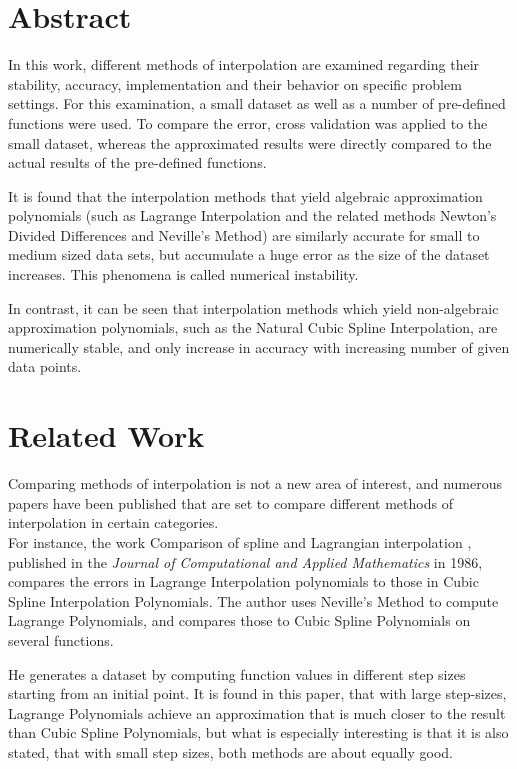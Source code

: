 \documentclass[a4paper,11pt, notitlepage]{article}
\newcommand{\enq}[1]{\grqq{}#1\grqq{}}
\begin{document}
	
	\selectfont
	
	\begin{onehalfspace}
		
\section{Abstract} 
\label{sec:Abstract}	
In this work, different methods of interpolation are examined regarding their stability, accuracy, implementation and their behavior on specific problem settings. For this examination, a small dataset as well as a number of pre-defined functions were used. To compare the error, cross validation was applied to the small dataset, whereas the approximated results were directly compared to the actual results of the pre-defined functions.

It is found that the interpolation methods that yield algebraic approximation polynomials (such as Lagrange Interpolation and the related methods Newton's Divided Differences and Neville's Method) are similarly accurate for small to medium sized data sets, but accumulate a huge error as the size of the dataset increases. This phenomena is called numerical instability. 

In contrast, it can be seen that interpolation methods which yield non-algebraic approximation polynomials, such as the Natural Cubic Spline Interpolation, are numerically stable, and only increase in accuracy with increasing number of given data points.
\newpage

\section{Related Work}
\label{sec:Related Work}
Comparing methods of interpolation is not a new area of interest, and numerous papers have been published that are set to compare different methods of interpolation in certain categories.\\

For instance, the work \enq{Comparison of spline and Lagrangian interpolation} \cite{mcnamee1986comparison}, published in the \emph{Journal of Computational and Applied Mathematics} in 1986, compares the errors in Lagrange Interpolation polynomials to those in Cubic Spline Interpolation Polynomials. The author uses Neville's Method to compute Lagrange Polynomials, and compares those to Cubic Spline Polynomials on several functions. 

He generates a dataset by computing function values in different step sizes starting from an initial point. It is found in this paper, that with large step-sizes, Lagrange Polynomials achieve an approximation that is much closer to the result than Cubic Spline Polynomials, but what is especially interesting is that it is also stated, that with small step sizes, both methods are \enq{about equally good}.


\end{onehalfspace}
\end{document}
